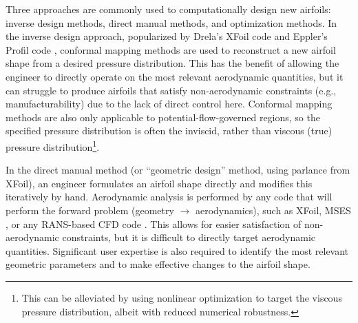 \documentclass[conf]{new-aiaa}
\begin{document}
    Three approaches are commonly used to computationally design new airfoils: inverse design methods, direct manual methods, and optimization methods. In the inverse design approach, popularized by Drela's XFoil code \cite{drela_xfoil_1989} and Eppler's Profil code \cite{profil, tao_bs_thesis}, conformal mapping methods are used to reconstruct a new airfoil shape from a desired pressure distribution. This has the benefit of allowing the engineer to directly operate on the most relevant aerodynamic quantities, but it can struggle to produce airfoils that satisfy non-aerodynamic constraints (e.g., manufacturability) due to the lack of direct control here. Conformal mapping methods are also only applicable to potential-flow-governed regions, so the specified pressure distribution is often the inviscid, rather than viscous (true) pressure distribution\footnote{This can be alleviated by using nonlinear optimization to target the viscous pressure distribution, albeit with reduced numerical robustness.}.

    In the direct manual method (or ``geometric design'' method, using parlance from XFoil), an engineer formulates an airfoil shape directly and modifies this iteratively by hand. Aerodynamic analysis is performed by any code that will perform the forward problem (geometry $\rightarrow$ aerodynamics), such as XFoil, MSES \cite{mses}, or any RANS-based CFD code \cite{adler_cfd_2022}. This allows for easier satisfaction of non-aerodynamic constraints, but it is difficult to directly target aerodynamic quantities. Significant user expertise is also required to identify the most relevant geometric parameters and to make effective changes to the airfoil shape.
\end{document}
